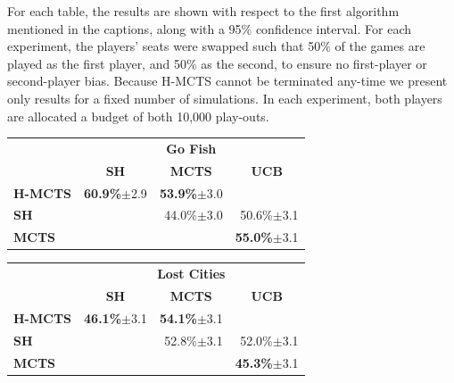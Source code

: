 \documentclass[a4paper]{llncs}
\begin{document}
For each table, the results are shown with respect to the first algorithm mentioned in the captions, along with a 95\% confidence interval. For each experiment, the players' seats were swapped such that 50\% of the games are played as the first player, and 50\% as the second, to ensure no first-player or second-player bias. Because H-MCTS cannot be terminated any-time we present only results for a fixed number of simulations. In each experiment, both players are allocated a budget of both 10,000 play-outs.

\begin{table}[ht]
\centering
\setlength{\tabcolsep}{10pt}
\begin{tabular}{@{}lrrr@{}}
\toprule
                & \multicolumn{3}{c}{\textbf{Go Fish}}                                                                   \\
                & \multicolumn{1}{c}{\textbf{SH}} & \multicolumn{1}{c}{\textbf{MCTS}} & \multicolumn{1}{c}{\textbf{UCB}} \\[1mm] \cmidrule(l){2-4} 
\textbf{H-MCTS} & \textbf{60.9\%}$\pm$2.9         & \textbf{53.9\%}$\pm$3.0           &                 				  \\ [.5mm] 
\textbf{SH}     & \textbf{}                       & 44.0\%$\pm$3.0                    & 50.6\%$\pm$3.1                    \\ [.5mm] 
\textbf{MCTS}   & \textbf{}                       & \textbf{}                         & \textbf{55.0\%}$\pm$3.1           \\ [.5mm] 
\end{tabular}
\begin{tabular}{@{}lrrr@{}}
\toprule
                & \multicolumn{3}{c}{\textbf{Lost Cities}}                                                                   \\
                & \multicolumn{1}{c}{\textbf{SH}} & \multicolumn{1}{c}{\textbf{MCTS}} & \multicolumn{1}{c}{\textbf{UCB}} \\ [1mm] \cmidrule(l){2-4} 
\textbf{H-MCTS} & \textbf{46.1\%}$\pm$3.1         & \textbf{54.1\%}$\pm$3.1           & 		                        \\[.5mm] 
\textbf{SH}     & \textbf{}                       & 52.8\%$\pm$3.1                    & 52.0\%$\pm$3.1                   \\[.5mm] 
\textbf{MCTS}   & \textbf{}                       & \textbf{}                         & \textbf{45.3\%}$\pm$3.1          \\[.5mm] 
\end{tabular}


\end{table}
\end{document}

